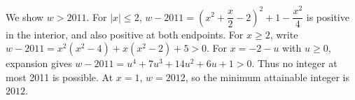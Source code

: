 We show $ w>2011 $. For $|x|\le2 $, $ w-2011=(x^2+\dfrac{x}{2}-2)^2+1-\dfrac{x^2}{4}$ is positive in the interior, and also positive at both endpoints. For $ x\ge2 $, write $ w-2011=x^2(x^2-4)+x(x^2-2)+5>0 $. For $ x=-2-u $ with $ u\ge0 $, expansion gives $ w-2011=u^4+7u^3+14u^2+6u+1>0 $. Thus no integer at most 2011 is possible. At $ x=1 $, $ w=2012 $, so the minimum attainable integer is $\boxed{2012}$.
